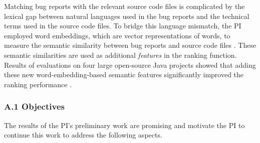 Matching bug reports with the relevant source code files is complicated by the lexical gap between natural languages used in the bug reports and the technical terms used in the source code files. To bridge this language mismatch, the PI employed word embeddings, which are vector representations of words, to measure the semantic similarity between bug reports and source code files \cite{Ye:ICSE16}. These semantic similarities are used as additional \textit{features} in the ranking function. Results of evaluations on four large open-source Java projects showed that adding these new word-embedding-based semantic features significantly improved the ranking performance \cite{Ye:ICSE16, Ye:Dissertation}.

\subsubsection{A.1 Objectives}
\label{sec:objectives}
The results of the PI's preliminary work are promising and motivate the PI to continue this work to address the following aspects.
